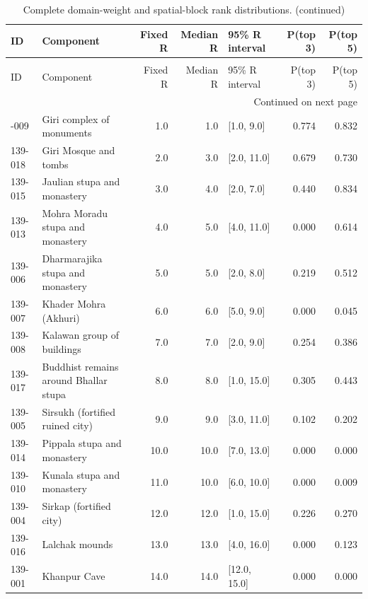 \begin{landscape}
\begingroup
\scriptsize
\setlength{\tabcolsep}{3pt}
\begin{longtable}{p{}p{}rrp{}rr}
\caption{Complete domain-weight and spatial-block rank distributions.}\label{tab:s-rank-uncertainty}\\
\toprule
ID & Component & Fixed R & Median R & 95\% R interval & P(top 3) & P(top 5) \\
\midrule
\endfirsthead
\caption[]{Complete domain-weight and spatial-block rank distributions. (continued)}\\
\toprule
ID & Component & Fixed R & Median R & 95\% R interval & P(top 3) & P(top 5) \\
\midrule
\endhead
\midrule
\multicolumn{7}{r}{Continued on next page}\\
\endfoot
\bottomrule
\endlastfoot
139-009 & Giri complex of monuments & 1.0 & 1.0 & [1.0, 9.0] & 0.774 & 0.832 \\
139-018 & Giri Mosque and tombs & 2.0 & 3.0 & [2.0, 11.0] & 0.679 & 0.730 \\
139-015 & Jaulian stupa and monastery & 3.0 & 4.0 & [2.0, 7.0] & 0.440 & 0.834 \\
139-013 & Mohra Moradu stupa and monastery & 4.0 & 5.0 & [4.0, 11.0] & 0.000 & 0.614 \\
139-006 & Dharmarajika stupa and monastery & 5.0 & 5.0 & [2.0, 8.0] & 0.219 & 0.512 \\
139-007 & Khader Mohra (Akhuri) & 6.0 & 6.0 & [5.0, 9.0] & 0.000 & 0.045 \\
139-008 & Kalawan group of buildings & 7.0 & 7.0 & [2.0, 9.0] & 0.254 & 0.386 \\
139-017 & Buddhist remains around Bhallar stupa & 8.0 & 8.0 & [1.0, 15.0] & 0.305 & 0.443 \\
139-005 & Sirsukh (fortified ruined city) & 9.0 & 9.0 & [3.0, 11.0] & 0.102 & 0.202 \\
139-014 & Pippala stupa and monastery & 10.0 & 10.0 & [7.0, 13.0] & 0.000 & 0.000 \\
139-010 & Kunala stupa and monastery & 11.0 & 10.0 & [6.0, 10.0] & 0.000 & 0.009 \\
139-004 & Sirkap (fortified city) & 12.0 & 12.0 & [1.0, 15.0] & 0.226 & 0.270 \\
139-016 & Lalchak mounds & 13.0 & 13.0 & [4.0, 16.0] & 0.000 & 0.123 \\
139-001 & Khanpur Cave & 14.0 & 14.0 & [12.0, 15.0] & 0.000 & 0.000 \\

\end{longtable}
\end{landscape}
